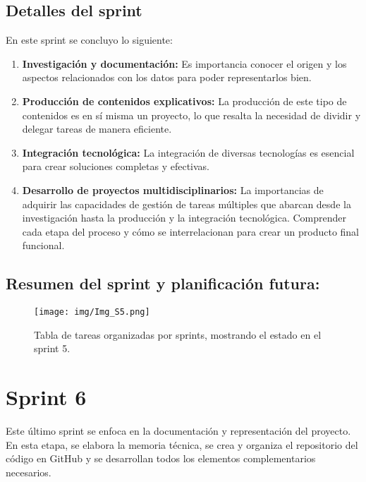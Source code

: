 \documentclass[a4paper, 12pt]{book}
\begin{document}
            
            \subsection{Detalles del sprint}

            En este sprint se concluyo lo siguiente:
            \begin{enumerate}
                \item \textbf{Investigación y documentación:} Es importancia conocer el origen y los aspectos relacionados con los datos para poder representarlos bien.
                \item \textbf{Producción de contenidos explicativos:} La producción de este tipo de contenidos es en sí misma un proyecto, lo que resalta la necesidad de dividir y delegar tareas de manera eficiente.
                \item \textbf{Integración tecnológica:} La integración de diversas tecnologías es esencial para crear soluciones completas y efectivas.
                \item \textbf{Desarrollo de proyectos multidisciplinarios:} La importancias de adquirir las capacidades de gestión de tareas múltiples que abarcan desde la investigación hasta la producción y la integración tecnológica. Comprender cada etapa del proceso y cómo se interrelacionan para crear un producto final funcional.
            \end{enumerate}

            \subsection{Resumen del sprint y planificación futura:}
            \begin{figure}[H]
                \centering
                \texttt{[image: img/Img\_S5.png]}
                \caption{\footnotesize Tabla de tareas organizadas por sprints, mostrando el estado en el sprint 5.}
                \label{fig:enter-label}
            \end{figure}     




    \newpage
    \section{Sprint 6}    

    Este último sprint se enfoca en la documentación y representación del proyecto. En esta etapa, se elabora la memoria técnica, se crea y organiza el repositorio del código en GitHub y se desarrollan todos los elementos complementarios necesarios.
    
\end{document}
